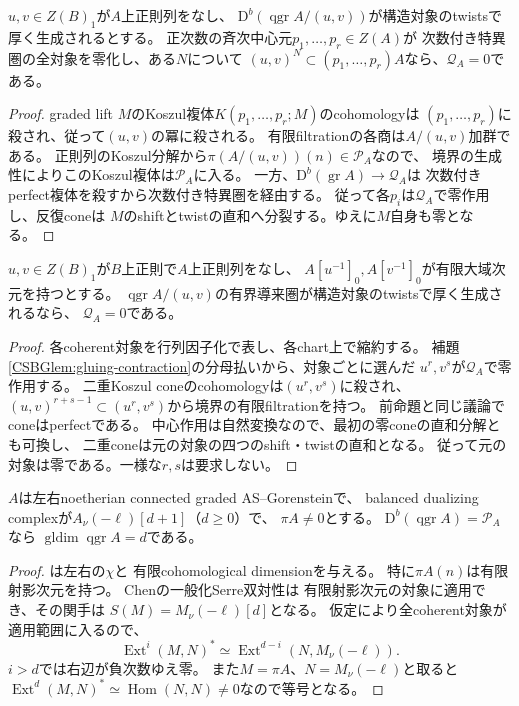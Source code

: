 \begin{proposition}[中心零化元による十分条件]
\label{CSBGprop:global-annihilators}
$u,v\in Z(B)_1$が$A$上正則列をなし、
$\mathrm D^b(\operatorname{qgr}A/(u,v))$が構造対象のtwistsで厚く生成されるとする。
正次数の斉次中心元$p_1,\ldots,p_r\in Z(A)$が
次数付き特異圏の全対象を零化し、ある$N$について
$(u,v)^N\subset(p_1,\ldots,p_r)A$なら、$\mathcal Q_A=0$である。
\end{proposition}
\begin{proof}
graded lift $M$のKoszul複体$K(p_1,\ldots,p_r;M)$のcohomologyは
$(p_1,\ldots,p_r)$に殺され、従って$(u,v)$の冪に殺される。
有限filtrationの各商は$A/(u,v)$加群である。
正則列のKoszul分解から$\pi(A/(u,v))(n)\in\mathcal P_A$なので、
境界の生成性によりこのKoszul複体は$\mathcal P_A$に入る。
一方、$\mathrm D^b(\operatorname{gr}A)\to\mathcal Q_A$は
次数付きperfect複体を殺すから次数付き特異圏を経由する。
従って各$p_i$は$\mathcal Q_A$で零作用し、反復coneは
$M$のshiftとtwistの直和へ分裂する。ゆえに$M$自身も零となる。
\end{proof}

\begin{proposition}[二つの中心chartの貼合せ]
\label{CSBGprop:global-two-charts}
$u,v\in Z(B)_1$が$B$上正則で$A$上正則列をなし、
$A[u^{-1}]_0,A[v^{-1}]_0$が有限大域次元を持つとする。
$\operatorname{qgr}A/(u,v)$の有界導来圏が構造対象のtwistsで厚く生成されるなら、
$\mathcal Q_A=0$である。
\end{proposition}
\begin{proof}
各coherent対象を行列因子化で表し、各chart上で縮約する。
補題\ref{CSBGlem:gluing-contraction}の分母払いから、対象ごとに選んだ
$u^r,v^s$が$\mathcal Q_A$で零作用する。
二重Koszul coneのcohomologyは$(u^r,v^s)$に殺され、
$(u,v)^{r+s-1}\subset(u^r,v^s)$から境界の有限filtrationを持つ。
前命題と同じ議論でconeはperfectである。
中心作用は自然変換なので、最初の零coneの直和分解とも可換し、
二重coneは元の対象の四つのshift・twistの直和となる。
従って元の対象は零である。一様な$r,s$は要求しない。
\end{proof}

\begin{lemma}[perfect性とSerre双対性からの正確な次元]
\label{CSBGlem:gluing-serre-dimension}
$A$は左右noetherian connected graded AS--Gorensteinで、
balanced dualizing complexが$A_\nu(-\ell)[d+1]$（$d\ge0$）で、
$\pi A\ne0$とする。
$\mathrm D^b(\operatorname{qgr}A)=\mathcal P_A$なら
$\operatorname{gldim}\operatorname{qgr}A=d$である。
\end{lemma}
\begin{proof}
\cite[Theorem~4.2, Corollary~4.3]{CSBGYZSerre}は左右の$\chi$と
有限cohomological dimensionを与える。
特に$\pi A(n)$は有限射影次元を持つ。
Chen\cite[Theorem~3.10]{CSBGChenGeneralizedSerre}の一般化Serre双対性は
有限射影次元の対象に適用でき、その関手は
$S(M)=M_\nu(-\ell)[d]$となる。
仮定により全coherent対象が適用範囲に入るので、
\[
 \operatorname{Ext}^i(M,N)^*
 \simeq\operatorname{Ext}^{d-i}(N,M_\nu(-\ell)).
\]
$i>d$では右辺が負次数ゆえ零。
また$M=\pi A$、$N=M_\nu(-\ell)$と取ると
$\operatorname{Ext}^d(M,N)^*\simeq\operatorname{Hom}(N,N)\ne0$なので等号となる。
\end{proof}

